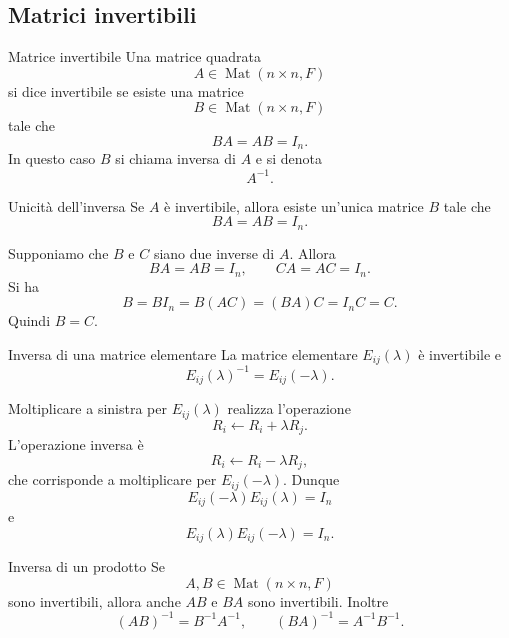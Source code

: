 \documentclass[a4paper]{article}
\begin{document}
\subsection{Matrici invertibili}

\begin{snippetdefinition}{Matrice invertibile}
    Una matrice quadrata
    \[
        A\in\operatorname{Mat}(n\times n,F)
    \]
    si dice invertibile se esiste una matrice
    \[
        B\in\operatorname{Mat}(n\times n,F)
    \]
    tale che
    \[
        BA=AB=I_n.
    \]
    In questo caso \(B\) si chiama inversa di \(A\) e si denota
    \[
        A^{-1}.
    \]
\end{snippetdefinition}

\begin{snippetproposition}{Unicità dell'inversa}
    Se \(A\) è invertibile, allora esiste un'unica matrice \(B\) tale che
    \[
        BA=AB=I_n.
    \]
\end{snippetproposition}

\begin{snippetproof}{}
    Supponiamo che \(B\) e \(C\) siano due inverse di \(A\). Allora
    \[
        BA=AB=I_n,
        \qquad
        CA=AC=I_n.
    \]
    Si ha
    \[
        B=BI_n=B(AC)=(BA)C=I_nC=C.
    \]
    Quindi \(B=C\).
\end{snippetproof}

\begin{snippetproposition}{Inversa di una matrice elementare}
    La matrice elementare \(E_{ij}(\lambda)\) è invertibile e
    \[
        E_{ij}(\lambda)^{-1}=E_{ij}(-\lambda).
    \]
\end{snippetproposition}

\begin{snippetproof}{}
    Moltiplicare a sinistra per \(E_{ij}(\lambda)\) realizza l'operazione
    \[
        R_i \longleftarrow R_i+\lambda R_j.
    \]
    L'operazione inversa è
    \[
        R_i \longleftarrow R_i-\lambda R_j,
    \]
    che corrisponde a moltiplicare per \(E_{ij}(-\lambda)\). Dunque
    \[
        E_{ij}(-\lambda)E_{ij}(\lambda)=I_n
    \]
    e
    \[
        E_{ij}(\lambda)E_{ij}(-\lambda)=I_n.
    \]
\end{snippetproof}

\begin{snippetproposition}{Inversa di un prodotto}
    Se
    \[
        A,B\in\operatorname{Mat}(n\times n,F)
    \]
    sono invertibili, allora anche \(AB\) e \(BA\) sono invertibili. Inoltre
    \[
        (AB)^{-1}=B^{-1}A^{-1},
        \qquad
        (BA)^{-1}=A^{-1}B^{-1}.
    \]
\end{snippetproposition}
\end{document}
